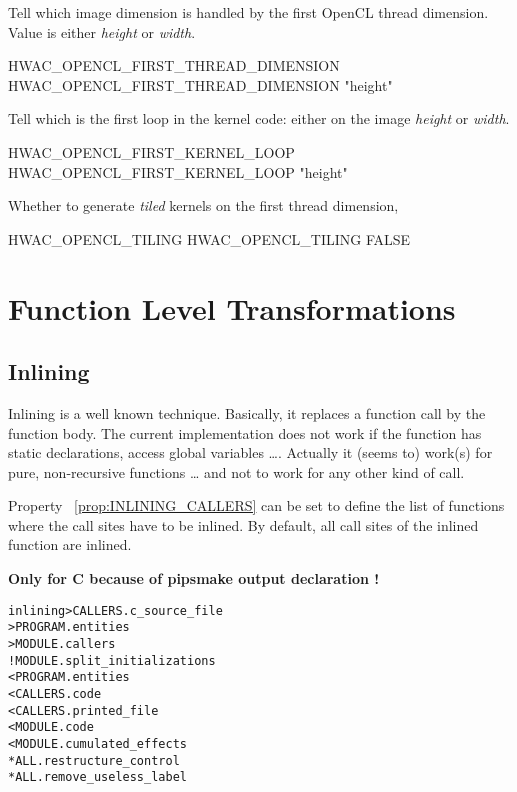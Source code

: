 \documentclass[a4paper]{report}
\newenvironment{PipsMake}{\begin{alltt}}{\end{alltt}}
\newcommand{\PipsPropRef}[1]{\texttt{\detokenize{#1}}~\ref{prop:#1}}
\newenvironment{PipsPass}[1]{\label{pass:#1}}{}
\begin{document}
Tell which image dimension is handled by the first OpenCL thread dimension.
Value is either \emph{height} or \emph{width}.
\begin{PipsProp}{HWAC_OPENCL_FIRST_THREAD_DIMENSION}
HWAC_OPENCL_FIRST_THREAD_DIMENSION "height"
\end{PipsProp}

Tell which is the first loop in the kernel code: either on the image
\emph{height} or \emph{width}.
\begin{PipsProp}{HWAC_OPENCL_FIRST_KERNEL_LOOP}
HWAC_OPENCL_FIRST_KERNEL_LOOP "height"
\end{PipsProp}

Whether to generate \emph{tiled} kernels on the first thread dimension,
\begin{PipsProp}{HWAC_OPENCL_TILING}
HWAC_OPENCL_TILING FALSE
\end{PipsProp}



\section{Function Level Transformations}



\subsection{Inlining}
\label{subsection-inlining}

\begin{PipsPass}{inlining}
Inlining is a well known technique.  Basically, it replaces a function
call by the function body. The current implementation does not work if
the function has static declarations, access global variables \dots.
Actually it (seems to) work(s) for pure, non-recursive functions \dots
and not to work for any other kind of call.

Property \PipsPropRef{INLINING_CALLERS} can be set to define the list of
functions where the call sites have to be inlined. By default, all
call sites of the inlined function are inlined.
\end{PipsPass}

\textbf{Only for C because of pipsmake output declaration !}
\begin{PipsMake}
inlining      > CALLERS.c_source_file
              > PROGRAM.entities
              > MODULE.callers
		! MODULE.split_initializations
        < PROGRAM.entities
        < CALLERS.code
        < CALLERS.printed_file
		< MODULE.code
        < MODULE.cumulated_effects
        * ALL.restructure_control
		* ALL.remove_useless_label
\end{PipsMake}
\end{document}
